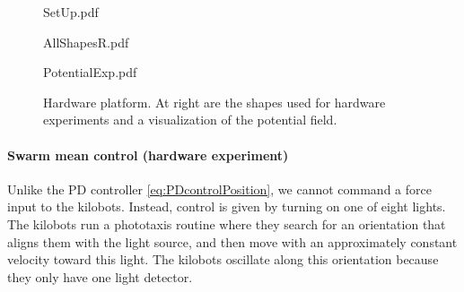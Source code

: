 
\begin{figure*}
\begin{center}
	\begin{overpic}[width=0.5\columnwidth]{SetUp.pdf}%
	\end{overpic}\begin{overpic}[width=0.25\columnwidth]{AllShapesR.pdf}%
	\end{overpic}\begin{overpic}[width=0.25\columnwidth]{PotentialExp.pdf}%
	\end{overpic}
\end{center}
\caption{\label{fig:setup}
Hardware platform. At right are the shapes used for hardware experiments and a visualization of the potential field. }
\end{figure*}


\paragraph{Swarm mean control (hardware experiment)}

Unlike the PD controller \eqref{eq:PDcontrolPosition}, we cannot command a force input to the kilobots.  Instead, control is given by turning on one of eight lights.  The kilobots run a phototaxis routine where they search for an orientation that aligns them with the light source, and then move with an approximately constant velocity toward this light.   The kilobots oscillate along this orientation because they only have one light detector.  

